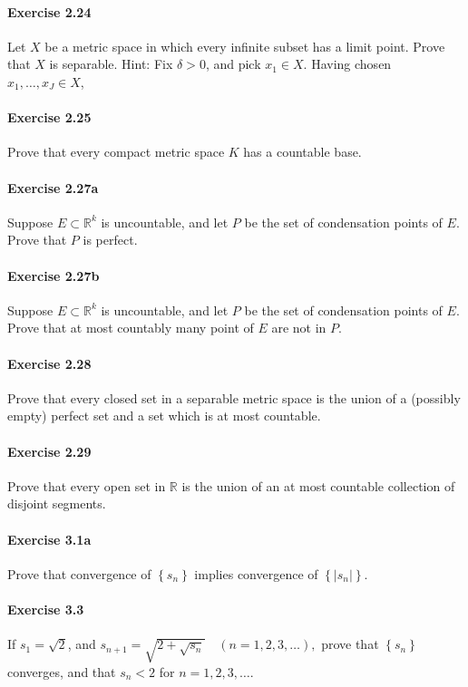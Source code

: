 \documentclass{article}
\begin{document}
\paragraph{Exercise 2.24} Let $X$ be a metric space in which every infinite subset has a limit point. Prove that $X$ is separable. Hint: Fix $\delta>0$, and pick $x_{1} \in X$. Having chosen $x_{1}, \ldots, x_{J} \in X$,

\paragraph{Exercise 2.25} Prove that every compact metric space $K$ has a countable base.

\paragraph{Exercise 2.27a} Suppose $E\subset\mathbb{R}^k$ is uncountable, and let $P$ be the set of condensation points of $E$. Prove that $P$ is perfect.

\paragraph{Exercise 2.27b} Suppose $E\subset\mathbb{R}^k$ is uncountable, and let $P$ be the set of condensation points of $E$. Prove that at most countably many point of $E$ are not in $P$.

\paragraph{Exercise 2.28} Prove that every closed set in a separable metric space is the union of a (possibly empty) perfect set and a set which is at most countable.

\paragraph{Exercise 2.29} Prove that every open set in $\mathbb{R}$ is the union of an at most countable collection of disjoint segments.

\paragraph{Exercise 3.1a} Prove that convergence of $\left\{s_{n}\right\}$ implies convergence of $\left\{\left|s_{n}\right|\right\}$.

\paragraph{Exercise 3.3} If $s_{1}=\sqrt{2}$, and $s_{n+1}=\sqrt{2+\sqrt{s_{n}}} \quad(n=1,2,3, \ldots),$ prove that $\left\{s_{n}\right\}$ converges, and that $s_{n}<2$ for $n=1,2,3, \ldots$.
\end{document}
